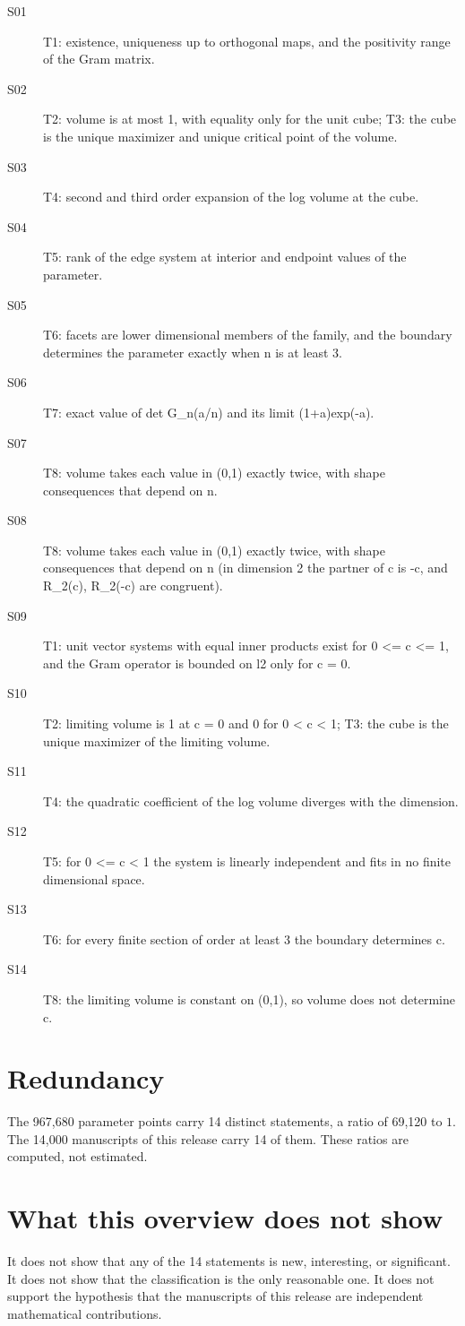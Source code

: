 \documentclass[11pt]{article}
\begin{document}
\begin{description}
\item[S01] T1: existence, uniqueness up to orthogonal maps, and the positivity range of the Gram matrix.
\item[S02] T2: volume is at most 1, with equality only for the unit cube; T3: the cube is the unique maximizer and unique critical point of the volume.
\item[S03] T4: second and third order expansion of the log volume at the cube.
\item[S04] T5: rank of the edge system at interior and endpoint values of the parameter.
\item[S05] T6: facets are lower dimensional members of the family, and the boundary determines the parameter exactly when n is at least 3.
\item[S06] T7: exact value of det G\_n(a/n) and its limit (1+a)exp(-a).
\item[S07] T8: volume takes each value in (0,1) exactly twice, with shape consequences that depend on n.
\item[S08] T8: volume takes each value in (0,1) exactly twice, with shape consequences that depend on n (in dimension 2 the partner of c is -c, and R\_2(c), R\_2(-c) are congruent).
\item[S09] T1: unit vector systems with equal inner products exist for 0 <= c <= 1, and the Gram operator is bounded on l2 only for c = 0.
\item[S10] T2: limiting volume is 1 at c = 0 and 0 for 0 < c < 1; T3: the cube is the unique maximizer of the limiting volume.
\item[S11] T4: the quadratic coefficient of the log volume diverges with the dimension.
\item[S12] T5: for 0 <= c < 1 the system is linearly independent and fits in no finite dimensional space.
\item[S13] T6: for every finite section of order at least 3 the boundary determines c.
\item[S14] T8: the limiting volume is constant on (0,1), so volume does not determine c.
\end{description}

\section{Redundancy}
The 967,680 parameter points carry 14 distinct statements, a ratio of 69,120 to $1$. The 14,000 manuscripts of this release carry 14 of them. These ratios are computed, not estimated.

\section{What this overview does not show}
It does not show that any of the 14 statements is new, interesting, or significant. It does not show that the classification is the only reasonable one. It does not support the hypothesis that the manuscripts of this release are independent mathematical contributions.
\end{document}
